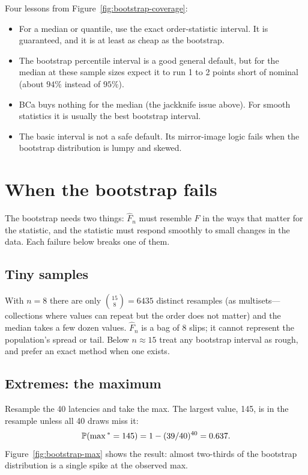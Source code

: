 Four lessons from Figure~\ref{fig:bootstrap-coverage}:
\begin{itemize}
  \item For a median or quantile, use the exact order-statistic interval. It
  is guaranteed, and it is at least as cheap as the bootstrap.
  \item The bootstrap percentile interval is a good general default, but for
  the median at these sample sizes expect it to run 1 to 2 points short of
  nominal (about $94\%$ instead of $95\%$).
  \item BCa buys nothing for the median (the jackknife issue above). For smooth
  statistics it is usually the best bootstrap interval.
  \item The basic interval is not a safe default. Its mirror-image logic fails
  when the bootstrap distribution is lumpy and skewed.
\end{itemize}

\section{When the bootstrap fails}
\label{sec:boot-fails}

The bootstrap needs two things: $\hat F_n$ must resemble $F$ in the ways that
matter for the statistic, and the statistic must respond smoothly to small
changes in the data. Each failure below breaks one of them.

\subsection{Tiny samples}

With $n = 8$ there are only $\binom{15}{8} = 6435$ distinct resamples (as
multisets---collections where values can repeat but the order does not matter)
and the median takes a few dozen values. $\hat F_n$
is a bag of 8 slips; it cannot represent the population's spread or tail.
Below $n \approx 15$ treat any bootstrap interval as rough, and prefer an exact
method when one exists.

\subsection{Extremes: the maximum}

Resample the 40 latencies and take the max. The largest value, 145, is in the
resample unless all 40 draws miss it:
\[
  \P(\max{}^* = 145) = 1 - (39/40)^{40} = 0.637 .
\]
Figure~\ref{fig:bootstrap-max} shows the result: almost two-thirds of the
bootstrap distribution is a single spike at the observed max.

